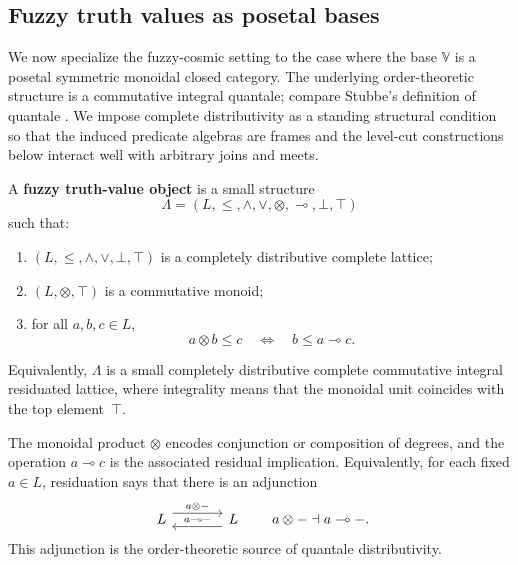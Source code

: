 \subsection{Fuzzy truth values as posetal bases}
\label{subsec:fuzzy-truth-values}

We now specialize the fuzzy-cosmic setting to the case where the base \(\mathbb V\) is a posetal symmetric monoidal closed category. The underlying order-theoretic structure is a commutative integral quantale; compare Stubbe's definition of quantale
\cite[Definition~2.1]{stubbe-2014-quantaloid-enriched}. We impose complete distributivity as a standing structural condition so that the induced predicate algebras are frames and the level-cut constructions below interact well with arbitrary joins and meets.

\begin{definition}
\label{def:fuzzy-truth-value-object}
    A \textbf{fuzzy truth-value object} is a small structure
    \[
        \Lambda=(L,\leq,\wedge,\vee,\otimes,\multimap,\bot,\top)
    \]
    such that:
    \begin{enumerate}
        \item \((L,\leq,\wedge,\vee,\bot,\top)\) is a completely distributive complete lattice;

        \item \((L,\otimes,\top)\) is a commutative monoid;

        \item for all \(a,b,c\in L\),
        \begin{equation}\label{eq:residuation-law}
            a\otimes b\leq c
            \quad\Longleftrightarrow\quad
            b\leq a\multimap c.
        \end{equation}
    \end{enumerate}
    Equivalently, \(\Lambda\) is a small completely distributive complete commutative integral residuated lattice, where integrality means that the monoidal unit coincides with the top element~\(\top\).
\end{definition}

The monoidal product \(\otimes\) encodes conjunction or composition of degrees, and the operation \(a\multimap c\) is the associated residual implication. Equivalently, for each fixed \(a\in L\), residuation says that there is an adjunction
\[
    \begin{tikzcd}[column sep=large]
        L \arrow[r,shift left=1.1ex,"a\otimes -"] &
        L \arrow[l,shift left=1.1ex,"a\multimap -"']
    \end{tikzcd}
    \qquad
    a\otimes - \dashv a\multimap - .
\]
This adjunction is the order-theoretic source of quantale distributivity.

